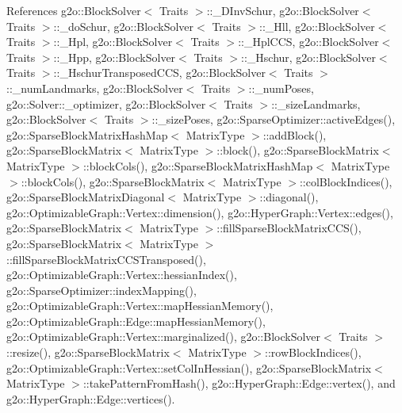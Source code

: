References g2o\+::\+Block\+Solver$<$ Traits $>$\+::\+\_\+\+D\+Inv\+Schur, g2o\+::\+Block\+Solver$<$ Traits $>$\+::\+\_\+do\+Schur, g2o\+::\+Block\+Solver$<$ Traits $>$\+::\+\_\+\+Hll, g2o\+::\+Block\+Solver$<$ Traits $>$\+::\+\_\+\+Hpl, g2o\+::\+Block\+Solver$<$ Traits $>$\+::\+\_\+\+Hpl\+C\+CS, g2o\+::\+Block\+Solver$<$ Traits $>$\+::\+\_\+\+Hpp, g2o\+::\+Block\+Solver$<$ Traits $>$\+::\+\_\+\+Hschur, g2o\+::\+Block\+Solver$<$ Traits $>$\+::\+\_\+\+Hschur\+Transposed\+C\+CS, g2o\+::\+Block\+Solver$<$ Traits $>$\+::\+\_\+num\+Landmarks, g2o\+::\+Block\+Solver$<$ Traits $>$\+::\+\_\+num\+Poses, g2o\+::\+Solver\+::\+\_\+optimizer, g2o\+::\+Block\+Solver$<$ Traits $>$\+::\+\_\+size\+Landmarks, g2o\+::\+Block\+Solver$<$ Traits $>$\+::\+\_\+size\+Poses, g2o\+::\+Sparse\+Optimizer\+::active\+Edges(), g2o\+::\+Sparse\+Block\+Matrix\+Hash\+Map$<$ Matrix\+Type $>$\+::add\+Block(), g2o\+::\+Sparse\+Block\+Matrix$<$ Matrix\+Type $>$\+::block(), g2o\+::\+Sparse\+Block\+Matrix$<$ Matrix\+Type $>$\+::block\+Cols(), g2o\+::\+Sparse\+Block\+Matrix\+Hash\+Map$<$ Matrix\+Type $>$\+::block\+Cols(), g2o\+::\+Sparse\+Block\+Matrix$<$ Matrix\+Type $>$\+::col\+Block\+Indices(), g2o\+::\+Sparse\+Block\+Matrix\+Diagonal$<$ Matrix\+Type $>$\+::diagonal(), g2o\+::\+Optimizable\+Graph\+::\+Vertex\+::dimension(), g2o\+::\+Hyper\+Graph\+::\+Vertex\+::edges(), g2o\+::\+Sparse\+Block\+Matrix$<$ Matrix\+Type $>$\+::fill\+Sparse\+Block\+Matrix\+C\+C\+S(), g2o\+::\+Sparse\+Block\+Matrix$<$ Matrix\+Type $>$\+::fill\+Sparse\+Block\+Matrix\+C\+C\+S\+Transposed(), g2o\+::\+Optimizable\+Graph\+::\+Vertex\+::hessian\+Index(), g2o\+::\+Sparse\+Optimizer\+::index\+Mapping(), g2o\+::\+Optimizable\+Graph\+::\+Vertex\+::map\+Hessian\+Memory(), g2o\+::\+Optimizable\+Graph\+::\+Edge\+::map\+Hessian\+Memory(), g2o\+::\+Optimizable\+Graph\+::\+Vertex\+::marginalized(), g2o\+::\+Block\+Solver$<$ Traits $>$\+::resize(), g2o\+::\+Sparse\+Block\+Matrix$<$ Matrix\+Type $>$\+::row\+Block\+Indices(), g2o\+::\+Optimizable\+Graph\+::\+Vertex\+::set\+Col\+In\+Hessian(), g2o\+::\+Sparse\+Block\+Matrix$<$ Matrix\+Type $>$\+::take\+Pattern\+From\+Hash(), g2o\+::\+Hyper\+Graph\+::\+Edge\+::vertex(), and g2o\+::\+Hyper\+Graph\+::\+Edge\+::vertices().


